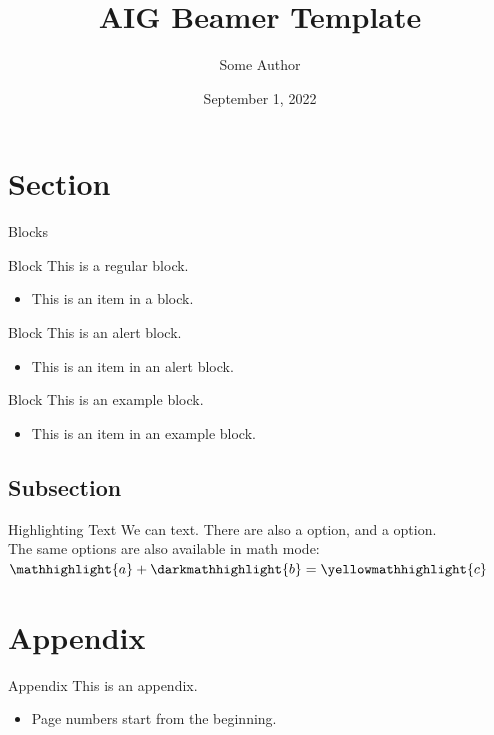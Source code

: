 \documentclass[aspectratio=169]{beamer} %
\title{AIG Beamer Template}
\author[S. Author]{Some Author}
\institute{Artificial Intelligence Group,\\
University of Hagen, Germany}
\date{September 1, 2022}
\begin{document}

\begin{frame}
  \titlepage
\end{frame}
\nologo

\section{Section}

\begin{frame}{Blocks}
    \begin{block}{Block}
        This is a regular block.
        \begin{itemize}
            \item This is an item in a block.
        \end{itemize}
    \end{block}
    
    \begin{alertblock}{Block}
        This is an alert block.
        \begin{itemize}
            \item This is an item in an alert block.
        \end{itemize}
    \end{alertblock}
    
    \begin{exampleblock}{Block}
        This is an example block.
        \begin{itemize}
            \item This is an item in an example block.
        \end{itemize}
    \end{exampleblock}
\end{frame}


\subsection{Subsection}

\begin{frame}{Highlighting Text}
    We can  text. There are also a  option, and a  option.\\
    The same options are also available in math mode: $\mathhighlight{a} + \darkmathhighlight{b} = \yellowmathhighlight{c}$
\end{frame}


\appendix

\section{Appendix}

\begin{frame}{Appendix}
    This is an appendix.
    \begin{itemize}
        \item Page numbers start from the beginning.
    \end{itemize}
\end{frame}
\end{document}
